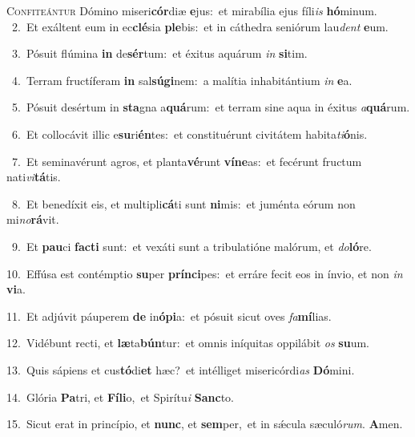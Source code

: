 \lettrine{\initial\textcolor{\initialcolor}{C}}{onfiteántur} Dómino miseri\-\textbf{cór}\-diæ \textbf{e}\-jus:~\star et mirabília ejus fíli\textit{is} \textbf{hó}\-minum.\\
{\numbfont\textcolor{\numbcolor}{~2.}}~Et exáltent eum in ec\-\textbf{clé}\-sia \textbf{ple}\-bis:~\star et in cáthedra seniórum lau\textit{dent} \textbf{e}\-um.\par
{\numbfont\textcolor{\numbcolor}{~3.}}~Pósuit flúmina \textbf{in} de\-\textbf{sér}\-tum:~\star et éxitus aquárum \textit{in} \textbf{si}\-tim.\par
{\numbfont\textcolor{\numbcolor}{~4.}}~Terram fructíferam \textbf{in} sal\-\textbf{sú}\-\textbf{gi}nem:~\star a malítia inhabitántium \textit{in} \textbf{e}\-a.\par
{\numbfont\textcolor{\numbcolor}{~5.}}~Pósuit desértum in \textbf{sta}\-gna a\-\textbf{quá}\-rum:~\star et terram sine aqua in éxitus \textit{a}\-\textbf{quá}rum.\par
{\numbfont\textcolor{\numbcolor}{~6.}}~Et collocávit illic e\-\textbf{su}\-ri\-\textbf{én}\-tes:~\star et constituérunt civitátem habita\-\textit{ti}\-\textbf{ó}nis.\par
{\numbfont\textcolor{\numbcolor}{~7.}}~Et seminavérunt agros, et planta\-\textbf{vé}\-runt \textbf{ví}\-\textbf{ne}as:~\star et fecérunt fructum nati\-\textit{vi}\-\textbf{tá}tis.\par
{\numbfont\textcolor{\numbcolor}{~8.}}~Et benedíxit eis, et multipli\-\textbf{cá}\-ti sunt \textbf{ni}\-mis:~\star et juménta eórum non mi\-\textit{no}\-\textbf{rá}vit.\par
{\numbfont\textcolor{\numbcolor}{~9.}}~Et \textbf{pau}\-ci \textbf{fac}\-\textbf{ti} sunt:~\star et vexáti sunt a tribulatióne malórum, et \textit{do}\-\textbf{ló}re.\par
{\numbfont\textcolor{\numbcolor}{10.}}~Effúsa est contémptio \textbf{su}\-per \textbf{prín}\-\textbf{ci}pes:~\star et erráre fecit eos in ínvio, et non \textit{in} \textbf{vi}\-a.\par
{\numbfont\textcolor{\numbcolor}{11.}}~Et adjúvit páuperem \textbf{de} in\-\textbf{ó}\-\textbf{pi}a:~\star et pósuit sicut oves \textit{fa}\-\textbf{mí}lias.\par
{\numbfont\textcolor{\numbcolor}{12.}}~Vidébunt recti, et \textbf{læ}\-ta\-\textbf{bún}\-tur:~\star et omnis iníquitas oppilábit \textit{os} \textbf{su}\-um.\par
{\numbfont\textcolor{\numbcolor}{13.}}~Quis sápiens et cus\-\textbf{tó}\-di\textbf{et} hæc?~\star et intélliget misericórdi\textit{as} \textbf{Dó}\-mini.\par
{\numbfont\textcolor{\numbcolor}{14.}}~Glória \textbf{Pa}\-tri, et \textbf{Fí}\-\textbf{li}o,~\star et Spirítu\textit{i} \textbf{Sanc}\-to.\par
{\numbfont\textcolor{\numbcolor}{15.}}~Sicut erat in princípio, et \textbf{nunc}\-, et \textbf{sem}\-per,~\star et in sǽcula sæculó\-\textit{rum}\-. \textbf{A}\-men.\par

